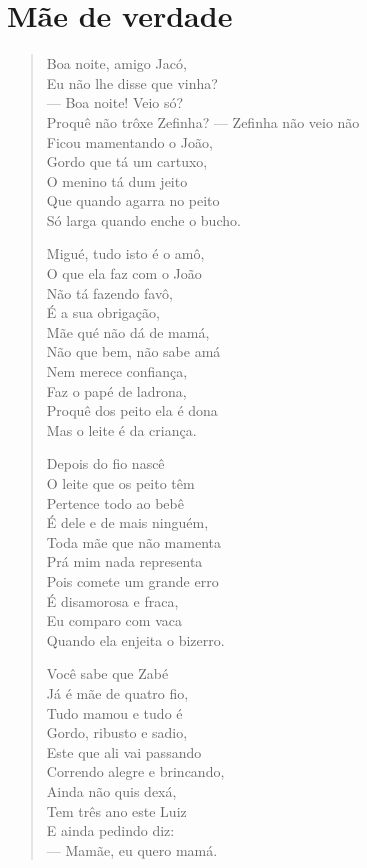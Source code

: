 \chapter{Mãe de verdade}

\begin{verse}
Boa noite, amigo Jacó,\\
Eu não lhe disse que vinha?\\
--- Boa noite! Veio só?\\
Proquê não trôxe Zefinha?
--- Zefinha não veio não\\
Ficou mamentando o João,\\
Gordo que tá um cartuxo,\\
O menino tá dum jeito\\
Que quando agarra no peito\\
Só larga quando enche o bucho.

Migué, tudo isto é o amô,\\
O que ela faz com o João\\
Não tá fazendo favô,\\
É a sua obrigação,\\
Mãe qué não dá de mamá,\\
Não que bem, não sabe amá\\
Nem merece confiança,\\
Faz o papé de ladrona,\\
Proquê dos peito ela é dona\\
Mas o leite é da criança.

Depois do fio nascê\\
O leite que os peito têm\\
Pertence todo ao bebê\\
É dele e de mais ninguém,\\
Toda mãe que não mamenta\\
Prá mim nada representa\\
Pois comete um grande erro\\
É disamorosa e fraca,\\
Eu comparo com vaca\\
Quando ela enjeita o bizerro.

Você sabe que Zabé\\
Já é mãe de quatro fio,\\
Tudo mamou e tudo é\\
Gordo, ribusto e sadio,\\
Este que ali vai passando\\
Correndo alegre e brincando,\\
Ainda não quis dexá,\\
Tem três ano este Luiz\\
E ainda pedindo diz:\\
--- Mamãe, eu quero mamá.


\end{verse}
